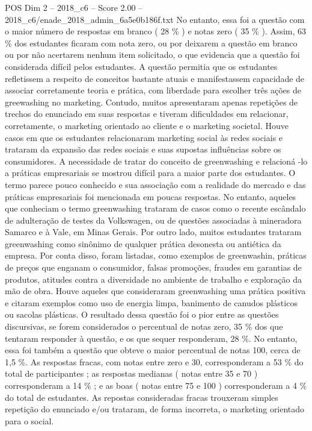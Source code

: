 \begin{textsample}{POS Dim 2 – 2018\_c6 – Score 2.00 – 2018\_c6/enade\_2018\_admin\_6a5e0b186f.txt}
No entanto, essa foi a questão com o maior número de respostas em branco ( 28 \% ) e notas zero ( 35 \% ).
Assim, 63 \% dos estudantes ficaram com nota zero, ou por deixarem a questão em branco ou por não acertarem nenhum item solicitado, o que evidencia que a questão foi considerada difícil pelos estudantes.
A questão permitia que os estudantes refletissem a respeito de conceitos bastante atuais e manifestassem capacidade de associar corretamente teoria e prática, com liberdade para escolher três ações de greewashing no marketing.
Contudo, muitos apresentaram apenas repetições de trechos do enunciado em suas respostas e tiveram dificuldades em relacionar, corretamente, o marketing orientado ao cliente e o marketing societal.
Houve casos em que os estudantes relacionaram marketing social às redes sociais e trataram da expansão das redes sociais e suas supostas influências sobre os consumidores.
A necessidade de tratar do conceito de greenwashing e relacioná -lo a práticas empresariais se mostrou difícil para a maior parte dos estudantes.
O termo parece pouco conhecido e sua associação com a realidade do mercado e das práticas empresariais foi mencionada em poucas respostas.
No entanto, aqueles que conheciam o termo greenwashing trataram de casos como o recente escândalo de adulteração de testes da Volkswagen, ou de questões associadas à mineradora Samarco e à Vale, em Minas Gerais.
Por outro lado, muitos estudantes trataram greenwashing como sinônimo de qualquer prática desonesta ou antiética da empresa.
Por conta disso, foram listadas, como exemplos de greenwashin, práticas de preços que enganam o consumidor, falsas promoções, fraudes em garantias de produtos, atitudes contra a diversidade no ambiente de trabalho e exploração da mão de obra.
Houve aqueles que consideraram greenwashing uma prática positiva e citaram exemplos como uso de energia limpa, banimento de canudos plásticos ou sacolas plásticas.
O resultado dessa questão foi o pior entre as questões discursivas, se forem considerados o percentual de notas zero, 35 \% dos que tentaram responder à questão, e os que sequer responderam, 28 \%.
No entanto, essa foi também a questão que obteve o maior percentual de notas 100, cerca de 1,5 \%.
As respostas fracas, com notas entre zero e 30, corresponderam a 53 \% do total de participantes ; as respostas medianas ( notas entre 35 e 70 ) corresponderam a 14 \% ; e as boas ( notas entre 75 e 100 ) corresponderam a 4 \% do total de estudantes.
As repostas consideradas fracas trouxeram simples repetição do enunciado e/ou trataram, de forma incorreta, o marketing orientado para o social.

\end{textsample}
